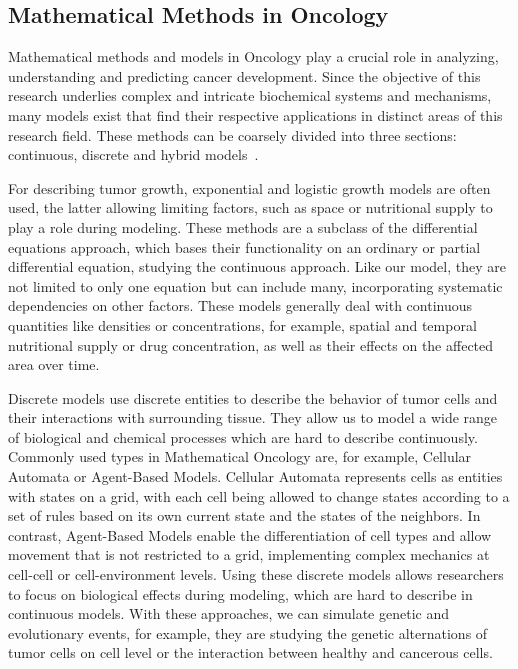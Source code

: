 \subsection{Mathematical Methods in Oncology}
Mathematical methods and models in Oncology play a crucial role in analyzing, understanding and predicting cancer development. Since the objective of this research underlies complex and intricate biochemical systems and mechanisms, many models exist that find their respective applications in distinct areas of this research field. These methods can be coarsely divided into three sections: continuous, discrete and hybrid models~\cite{BEKISZ2020101198}.

For describing tumor growth, exponential and logistic growth models are often used, the latter allowing limiting factors, such as space or nutritional supply to play a role during modeling. These methods are a subclass of the differential equations approach, which bases their functionality on an ordinary or partial differential equation, studying the continuous approach. Like our model, they are not limited to only one equation but can include many, incorporating systematic dependencies on other factors. These models generally deal with continuous quantities like densities or concentrations, for example, spatial and temporal nutritional supply or drug concentration, as well as their effects on the affected area over time. 

Discrete models use discrete entities to describe the behavior of tumor cells and their interactions with surrounding tissue. They allow us to model a wide range of biological and chemical processes which are hard to describe continuously. Commonly used types in Mathematical Oncology are, for example, Cellular Automata or Agent-Based Models. Cellular Automata represents cells as entities with states on a grid, with each cell being allowed to change states according to a set of rules based on its own current state and the states of the neighbors. In contrast, Agent-Based Models enable the differentiation of cell types and allow movement that is not restricted to a grid, implementing complex mechanics at cell-cell or cell-environment levels. Using these discrete models allows researchers to focus on biological effects during modeling, which are hard to describe in continuous models. With these approaches, we can simulate genetic and evolutionary events, for example, they are studying the genetic alternations of tumor cells on cell level or the interaction between healthy and cancerous cells.

